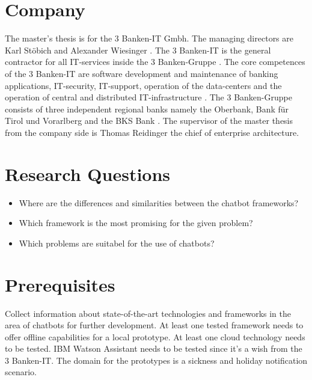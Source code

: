\section{Company}
The master's thesis is for the 3 Banken-IT Gmbh. The managing directors are Karl St\"obich and Alexander Wiesinger \cite{3bitorgani}. 
The 3 Banken-IT is the general contractor for all IT-services inside the 3 Banken-Gruppe \cite{3bitservices}. 
The core competences of the 3 Banken-IT are software development and maintenance of banking applications, IT-security, 
IT-support, operation of the data-centers and the operation of central and distributed IT-infrastructure \cite{3bitservices}. 
The 3 Banken-Gruppe consists of three independent regional banks namely the Oberbank, Bank für Tirol und Vorarlberg and the BKS Bank \cite{3bitcompany}. 
The supervisor of the master thesis from the company side is Thomas Reidinger the chief of enterprise architecture.

\section{Research Questions}
\begin{itemize}
    \item Where are the differences and similarities between the chatbot frameworks?
    \item Which framework is the most promising for the given problem?
    \item Which problems are suitabel for the use of chatbots?
\end{itemize}

\section{Prerequisites} \label{sec:prereq}
Collect information about state-of-the-art technologies and frameworks in the area of chatbots for further development.
At least one tested framework needs to offer offline capabilities for a local prototype.
At least one cloud technology needs to be tested.
IBM Watson Assistant needs to be tested since it's a wish from the 3 Banken-IT.
The domain for the prototypes is a sickness and holiday notification scenario.


